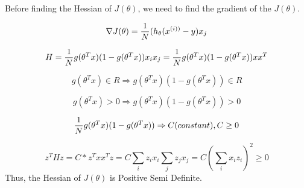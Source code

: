 \begin{answer}
    Before finding the Hessian of $J(\theta)$, we need to find the gradient of the $J(\theta)$.
    
\begin{equation}
    \nabla J(\theta) = {1\over N}(h_\theta(x^{(i))}-y)x_j
\end{equation}

\begin{equation}
    H = {1\over N}g(\theta^{T}x)(1-g(\theta^{T}x))x_ix_j
      = {1\over N}g(\theta^{T}x)(1-g(\theta^{T}x))xx^{T}
\end{equation}

\begin{equation}
    g(\theta^{T}x) \in R \Rightarrow g(\theta^{T}x)(1-g(\theta^{T}x)) \in R
\end{equation}

\begin{equation}
     g(\theta^{T}x) > 0 \Rightarrow  g(\theta^{T}x)(1-g(\theta^{T}x)) > 0
\end{equation}

\begin{equation}
    {1\over N}g(\theta^{T}x)(1-g(\theta^{T}x)) \Rightarrow C(constant),C \geq 0
\end{equation}

\begin{equation}
    z^{T}Hz = C*z^{T}xx^{T}z = C\sum_i z_ix_i \sum_j z_jx_j
    = C{(\sum_i x_iz_i)}^2 \geq 0
\end{equation}
    Thus, the Hessian of $J(\theta)$ is Positive Semi Definite.
\end{answer}
